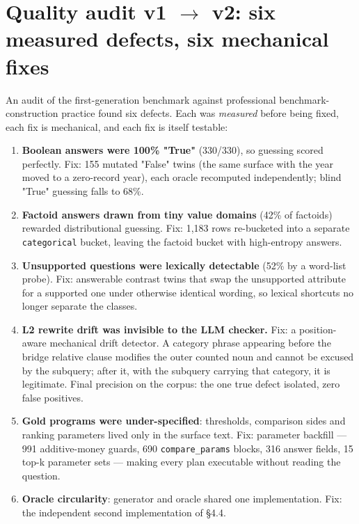 \documentclass[10pt]{article} %
\begin{document}
\section{Quality audit v1 $\rightarrow$ v2: six measured defects, six mechanical fixes}\label{sec:quality-audit-v1-v2-six-measured-defects}

An audit of the first-generation benchmark against professional benchmark-construction practice found six defects. Each was \emph{measured} before being fixed, each fix is mechanical, and each fix is itself testable:

\begin{enumerate}
\item \textbf{Boolean answers were 100\% "True"} (330/330), so guessing scored perfectly. Fix: 155 mutated "False" twins (the same surface with the year moved to a zero-record year), each oracle recomputed independently; blind "True" guessing falls to 68\%.
\item \textbf{Factoid answers drawn from tiny value domains} (42\% of factoids) rewarded distributional guessing. Fix: 1,183 rows re-bucketed into a separate \texttt{categorical} bucket, leaving the factoid bucket with high-entropy answers.
\item \textbf{Unsupported questions were lexically detectable} (52\% by a word-list probe). Fix: answerable contrast twins that swap the unsupported attribute for a supported one under otherwise identical wording, so lexical shortcuts no longer separate the classes.
\item \textbf{L2 rewrite drift was invisible to the LLM checker.} Fix: a position-aware mechanical drift detector. A category phrase appearing before the bridge relative clause modifies the outer counted noun and cannot be excused by the subquery; after it, with the subquery carrying that category, it is legitimate. Final precision on the corpus: the one true defect isolated, zero false positives.
\item \textbf{Gold programs were under-specified}: thresholds, comparison sides and ranking parameters lived only in the surface text. Fix: parameter backfill --- 991 additive-money guards, 690 \texttt{compare\_params} blocks, 316 answer fields, 15 top-k parameter sets --- making every plan executable without reading the question.
\item \textbf{Oracle circularity}: generator and oracle shared one implementation. Fix: the independent second implementation of \S4.4.
\end{enumerate}
\end{document}
